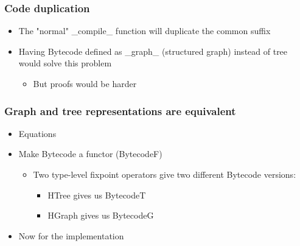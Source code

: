         \begin{frame}
            \frametitle{Code duplication}

            \begin{itemize}
                \item The "normal" _compile_ function will duplicate the common suffix
                \item Having Bytecode defined as _graph_ (structured graph) instead of tree
                    would solve this problem
                    \begin{itemize}
                        \item But proofs would be harder
                    \end{itemize}
            \end{itemize}
        \end{frame}

        \begin{frame}
            \frametitle{Graph and tree representations are equivalent}

            \begin{itemize}
                \item Equations
                \item Make Bytecode a functor (BytecodeF)
                    \begin{itemize}
                        \item Two type-level fixpoint operators give two different Bytecode versions:
                        \begin{itemize}
                            \item HTree gives us BytecodeT
                            \item HGraph gives us BytecodeG
                        \end{itemize}
                    \end{itemize}

                \item Now for the implementation
            \end{itemize}
        \end{frame}


